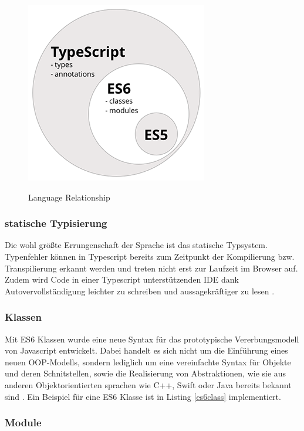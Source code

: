 \begin{figure}[ht]
 \centering
 \includegraphics[width=0.4\linewidth]{kapitel2/typescript----es5-es6-typescript-circle-diagram.png}
 \caption{Language Relationship}\cite[152]{ng-Book-2}
\end{figure}


\subsubsection{statische Typisierung}

Die wohl größte Errungenschaft der Sprache ist das statische Typsystem.
Typenfehler können in Typescript bereits zum Zeitpunkt
der Kompilierung bzw. Transpilierung erkannt werden und treten nicht erst zur Laufzeit im Browser auf.
Zudem wird Code in einer Typescript unterstützenden IDE dank Autovervollständigung
leichter zu schreiben und aussagekräftiger zu lesen \cite[156]{ng-Book-2}.

\subsubsection{Klassen}

Mit ES6 Klassen wurde eine neue Syntax für das prototypische Vererbungsmodell von Javascript entwickelt.
Dabei handelt es sich nicht um die Einführung eines neuen OOP-Modells, sondern lediglich um eine vereinfachte Syntax für Objekte und deren Schnitstellen,
sowie die Realisierung von Abstraktionen, wie sie aus anderen Objektorientierten sprachen wie C++, Swift oder Java bereits bekannt sind \cite{js-Klassen}.
Ein Beispiel für eine ES6 Klasse ist in Listing \ref{es6class} implementiert.



\subsubsection{Module}

